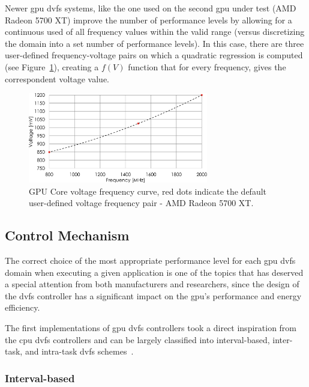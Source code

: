 Newer \acrshort{gpu} \acrshort{dvfs} systems, like the one used on the second \acrshort{gpu} under test (AMD Radeon 5700 XT) improve the number of performance levels by allowing for a continuous used of all frequency values within the valid range (versus discretizing the domain into a set number of performance levels). In this case, there are three user-defined frequency-voltage pairs on which a quadratic regression is computed  (see Figure~\ref{fig:voltage_curve}), creating a $f(V)$ function that for every frequency, gives the correspondent voltage value.

\begin{figure}[htb]
  \centering
  \includegraphics[width=0.7\textwidth]{Figures/Background/voltage_frequency_curve.pdf}
  \caption{GPU Core voltage frequency curve, red dots indicate the default user-defined voltage frequency pair - AMD Radeon 5700 XT.}
  \label{fig:voltage_curve}
\end{figure}

\subsection{Control Mechanism}

The correct choice of the most appropriate performance level for each \acrshort{gpu} \acrshort{dvfs} domain when executing a given application is one of the topics that has deserved a special attention from both manufacturers and researchers, since the design of the \acrshort{dvfs} controller has a significant impact on the \acrshort{gpu}'s performance and energy efficiency.

The first implementations of \acrshort{gpu} \acrshort{dvfs} controllers took a direct inspiration from the \acrshort{cpu} \acrshort{dvfs} controllers and can be largely classified into interval-based, inter-task, and intra-task \acrshort{dvfs} schemes~\cite{boyer_improving_2013}. 

\subsubsection{Interval-based}

